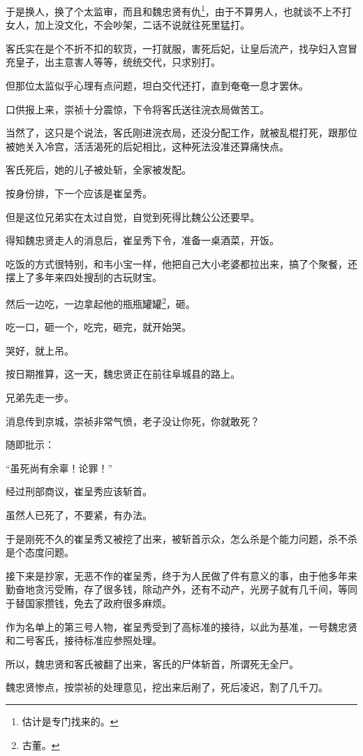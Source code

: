 \begin{multicols}{\theparacolNo}
		于是换人，换了个太监审，而且和魏忠贤有仇\footnote{估计是专门找来的。}，由于不算男人，也就谈不上不打女人，加上没文化，不会吵架，二话不说就往死里猛打。

		客氏实在是个不折不扣的软货，一打就服，害死后妃，让皇后流产，找孕妇入宫冒充皇子，出主意害人等等，统统交代，只求别打。

		但那位太监似乎心理有点问题，坦白交代还打，直到奄奄一息才罢休。

		口供报上来，崇祯十分震惊，下令将客氏送往浣衣局做苦工。

		当然了，这只是个说法，客氏刚进浣衣局，还没分配工作，就被乱棍打死，跟那位被她关入冷宫，活活渴死的后妃相比，这种死法没准还算痛快点。

		客氏死后，她的儿子被处斩，全家被发配。

		按身份排，下一个应该是崔呈秀。

		但是这位兄弟实在太过自觉，自觉到死得比魏公公还要早。

		得知魏忠贤走人的消息后，崔呈秀下令，准备一桌酒菜，开饭。

		吃饭的方式很特别，和韦小宝一样，他把自己大小老婆都拉出来，搞了个聚餐，还摆上了多年来四处搜刮的古玩财宝。

		然后一边吃，一边拿起他的瓶瓶罐罐\footnote{古董。}，砸。

		吃一口，砸一个，吃完，砸完，就开始哭。

		哭好，就上吊。

		按日期推算，这一天，魏忠贤正在前往阜城县的路上。

		兄弟先走一步。

		消息传到京城，崇祯非常气愤，老子没让你死，你就敢死？

		随即批示：

		“虽死尚有余辜！论罪！”

		经过刑部商议，崔呈秀应该斩首。

		虽然人已死了，不要紧，有办法。

		于是刚死不久的崔呈秀又被挖了出来，被斩首示众，怎么杀是个能力问题，杀不杀是个态度问题。

		接下来是抄家，无恶不作的崔呈秀，终于为人民做了件有意义的事，由于他多年来勤奋地贪污受贿，存了很多钱，除动产外，还有不动产，光房子就有几千间，等同于替国家攒钱，免去了政府很多麻烦。

		作为名单上的第三号人物，崔呈秀受到了高标准的接待，以此为基准，一号魏忠贤和二号客氏，接待标准应参照处理。

		所以，魏忠贤和客氏被翻了出来，客氏的尸体斩首，所谓死无全尸。

		魏忠贤惨点，按崇祯的处理意见，挖出来后剐了，死后凌迟，割了几千刀。


\end{multicols}
